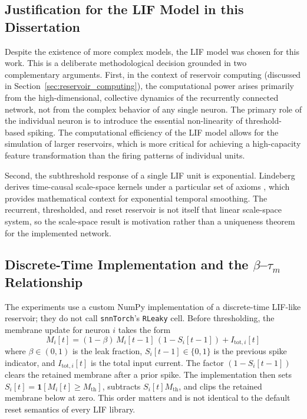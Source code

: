 \subsection{Justification for the LIF Model in this Dissertation}
\label{sec:lif_justification}
Despite the existence of more complex models, the LIF model was chosen for this work. This is a deliberate methodological decision grounded in two complementary arguments. First, in the context of reservoir computing (discussed in Section~\ref{sec:reservoir_computing}), the computational power arises primarily from the high-dimensional, collective dynamics of the recurrently connected network, not from the complex behavior of any single neuron. The primary role of the individual neuron is to introduce the essential non-linearity of threshold-based spiking. The computational efficiency of the LIF model allows for the simulation of larger reservoirs, which is more critical for achieving a high-capacity feature transformation than the firing patterns of individual units.

Second, the subthreshold response of a single LIF unit is exponential. Lindeberg derives time-causal scale-space kernels under a particular set of axioms \cite{lindeberg_2016}, which provides mathematical context for exponential temporal smoothing. The recurrent, thresholded, and reset reservoir is not itself that linear scale-space system, so the scale-space result is motivation rather than a uniqueness theorem for the implemented network.

\subsection{Discrete-Time Implementation and the $\beta$--$\tau_m$ Relationship}
\label{sec:discrete_lif}
The experiments use a custom NumPy implementation of a discrete-time LIF-like reservoir; they do not call \texttt{snnTorch}'s \texttt{RLeaky} cell. Before thresholding, the membrane update for neuron $i$ takes the form
\begin{equation}
    M_i[t] = (1 - \beta)\, M_i[t-1]\,(1 - S_i[t-1]) + I_{\text{tot},i}[t]
    \label{eq:lif_discrete}
\end{equation}
where $\beta \in (0,1)$ is the leak fraction, $S_i[t-1] \in \{0,1\}$ is the previous spike indicator, and $I_{\text{tot},i}[t]$ is the total input current. The factor $(1-S_i[t-1])$ clears the retained membrane after a prior spike. The implementation then sets $S_i[t]=\mathbf{1}[M_i[t]\geq M_{\text{th}}]$, subtracts $S_i[t]M_{\text{th}}$, and clips the retained membrane below at zero. This order matters and is not identical to the default reset semantics of every LIF library.

